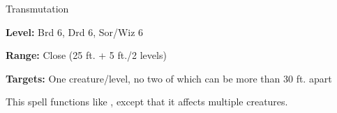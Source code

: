 \label{spell:Mass Cat's Grace}

Transmutation

\textbf{Level:} Brd 6, Drd 6, Sor/Wiz 6

\textbf{Range:} Close (25 ft. + 5 ft./2 levels)

\textbf{Targets:} One creature/level, no two of which can be more than 30 ft. apart

This spell functions like , except that it affects multiple 
creatures.


